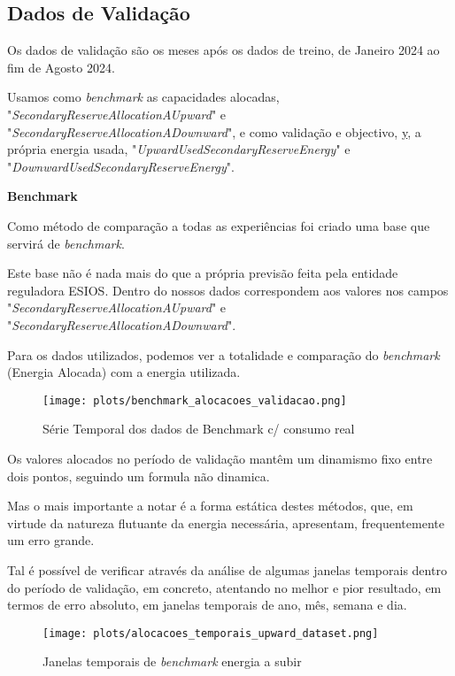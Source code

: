 \subsection{Dados de Validação}
Os dados de validação são os meses após os dados de treino, de Janeiro 2024 ao fim de Agosto 2024.\par
Usamos como \textit{benchmark} as capacidades alocadas, "\textit{SecondaryReserveAllocationAUpward}" e "\textit{SecondaryReserveAllocationADownward}", e como validação e objectivo, \hyperref[se:metneuralnet]{y}, a própria energia usada, "\textit{UpwardUsedSecondaryReserveEnergy}" e "\textit{DownwardUsedSecondaryReserveEnergy}".

\textbf{Benchmark}

Como método de comparação a todas as experiências foi criado uma base que servirá de \textit{benchmark}.\par
Este base não é nada mais do que a própria previsão feita pela entidade reguladora \gls{ESIOS}. Dentro do nossos dados correspondem aos valores nos campos "\textit{SecondaryReserveAllocationAUpward}" e "\textit{SecondaryReserveAllocationADownward}".\par
Para os dados utilizados, podemos ver a totalidade e comparação do \textit{benchmark} (Energia Alocada) com a energia utilizada.\par

\begin{figure}[H]
    \centering
    \texttt{[image: plots/benchmark\_alocacoes\_validacao.png]}
    \caption{Série Temporal dos dados de Benchmark c/ consumo real}
    \label{fig:benchmarktimeseries}
\end{figure}

Os valores alocados no período de validação mantêm um dinamismo fixo entre dois pontos, seguindo um formula não dinamica. \par
Mas o mais importante a notar é a forma estática destes métodos, que, em virtude da natureza flutuante da energia necessária, apresentam, frequentemente um erro grande.\par
Tal é possível de verificar através da análise de algumas janelas temporais dentro do período de validação, em concreto, atentando no melhor e pior resultado, em termos de erro absoluto, em janelas temporais de ano, mês, semana e dia.\par


\begin{figure}[H]
    \centering
    \texttt{[image: plots/alocacoes\_temporais\_upward\_dataset.png]}
    \caption{Janelas temporais de \textit{benchmark} energia a subir}
    \label{fig:benchmarktimewindowsup}
\end{figure}


